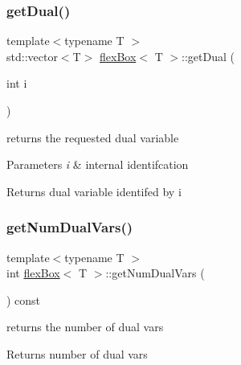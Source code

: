 \subsubsection{\texorpdfstring{get\+Dual()}{getDual()}}
{\footnotesize\ttfamily template$<$typename T $>$ \\
std\+::vector$<$T$>$ \hyperlink{classflex_box}{flex\+Box}$<$ T $>$\+::get\+Dual (\begin{DoxyParamCaption}\item[{int}]{i }\end{DoxyParamCaption})\hspace{0.3cm}{\ttfamily [inline]}}



returns the requested dual variable 


\begin{DoxyParams}{Parameters}
{\em i} & internal identifcation \\
\hline
\end{DoxyParams}
\begin{DoxyReturn}{Returns}
dual variable identifed by i 
\end{DoxyReturn}
\mbox{\label{classflex_box_ab6c7512dee891983f60e0f3a63bff8b5}} 
\subsubsection{\texorpdfstring{get\+Num\+Dual\+Vars()}{getNumDualVars()}}
{\footnotesize\ttfamily template$<$typename T $>$ \\
int \hyperlink{classflex_box}{flex\+Box}$<$ T $>$\+::get\+Num\+Dual\+Vars (\begin{DoxyParamCaption}{ }\end{DoxyParamCaption}) const\hspace{0.3cm}{\ttfamily [inline]}}



returns the number of dual vars 

\begin{DoxyReturn}{Returns}
number of dual vars 
\end{DoxyReturn}
\mbox{\label{classflex_box_a367b7a1fe57fd898ef7ad4159ed14a62}} 
